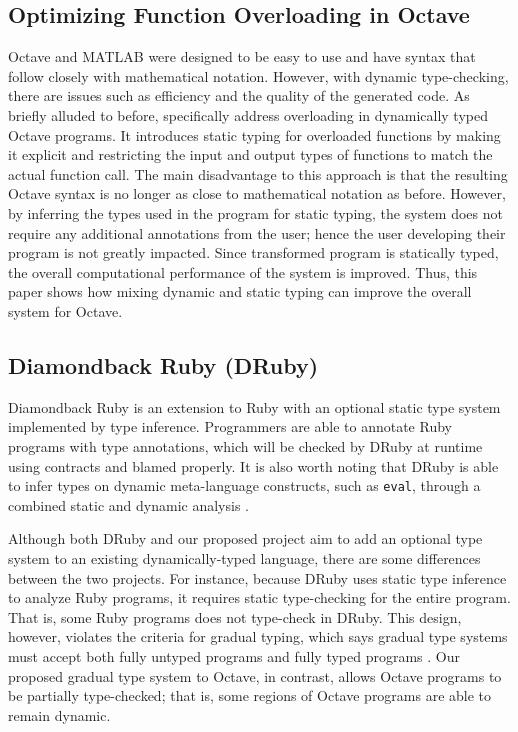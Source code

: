 \subsection{Optimizing Function Overloading in Octave}
Octave and MATLAB were designed to be easy to use and have syntax that follow closely with mathematical notation. However, with dynamic type-checking, there are issues such as efficiency and the quality of the generated code. As briefly alluded to before, \citet{olmos2003turning} specifically address overloading in dynamically typed Octave programs. It introduces static typing for overloaded functions by making it explicit and restricting the input and output types of functions to match the actual function call. The main disadvantage to this approach is that the resulting Octave syntax is no longer as close to mathematical notation as before. However, by inferring the types used in the program for static typing, the system does not require any additional annotations from the user; hence the user developing their program is not greatly impacted. Since transformed program is statically typed, the overall computational performance of the system is improved. Thus, this paper shows how mixing dynamic and static typing can improve the overall system for Octave.

\subsection{Diamondback Ruby (DRuby)}
Diamondback Ruby \cite{furr2009combining} is an extension to Ruby with an optional static type system implemented by type inference. Programmers are able to annotate Ruby programs with type annotations, which will be checked by DRuby at runtime using contracts and blamed properly. It is also worth noting that DRuby is able to infer types on dynamic meta-language constructs, such as {\tt eval}, through a combined static and dynamic analysis \cite{druby}.

Although both DRuby and our proposed project aim to add an optional type system to an existing dynamically-typed language, there are some differences between the two projects. For instance, because DRuby uses static type inference to analyze Ruby programs, it requires static type-checking for the entire program. That is, some Ruby programs does not type-check in DRuby. This design, however, violates the criteria for gradual typing, which says gradual type systems must accept both fully untyped programs and fully typed programs \cite{siek2015refined}.  Our proposed gradual type system to Octave, in contrast, allows Octave programs to be partially type-checked; that is, some regions of Octave programs are able to remain dynamic.

